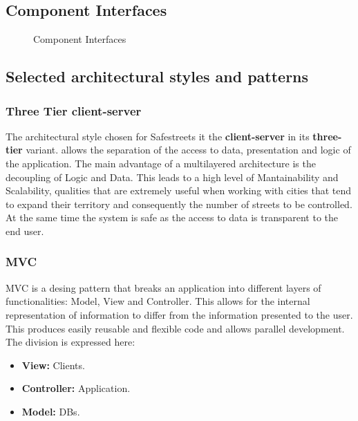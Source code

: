 \newpage
\subsection{Component Interfaces}
\begin{figure}[H]
		\caption{\label{fig:ComponentInterfaces}Component Interfaces}
	\end{figure}
\newpage
\subsection{Selected architectural styles and patterns}

\subsubsection{Three Tier client-server}

The architectural style chosen for Safestreets it the \textbf{client-server} in its \textbf{three-tier} variant.  allows the 
separation of the access to data, presentation and logic of the application.
The main advantage of a multilayered architecture is the decoupling of Logic and Data. This leads to a high level of Mantainability and Scalability, 
qualities that are extremely useful when working with cities that tend to expand their territory and consequently the number of streets to be controlled.
At the same time the system is safe as the access to data is transparent to the end user.

\subsubsection{MVC}

MVC is a desing pattern that breaks an application into different layers	of functionalities:	Model, View and Controller.
This allows for the internal representation of information to differ from the information presented to the user. 
This produces easily reusable and flexible code and allows parallel development. The division is expressed here:

\begin{itemize}
    \item \textbf{View:} Clients.
    \item \textbf{Controller:} Application.
    \item \textbf{Model:} DBs.
    
    
\end{itemize}

